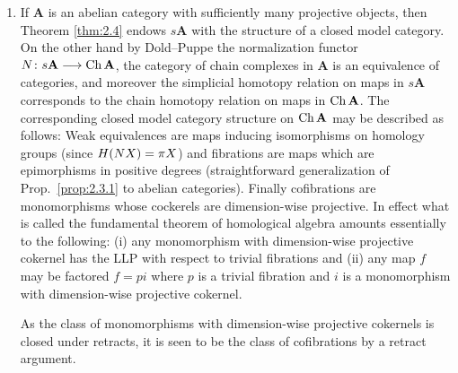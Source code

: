 \documentclass[../main]{subfiles}
\begin{document}
\begin{remarks*}
\begin{enumerate}
\begin{enumerate}[(i)]
        \item $f_q + g_q \colon X_q \vee FC_q \longrightarrow Z_q$ is an isomorphism for all $q$, where $FC_q$ is the free algebra generated by $C_q$ and $g_q\colon FC_q \longrightarrow Z_q$ is the unique algebra map which is the identity on $C_q$.
    \end{enumerate}
    Conversely, one may show \cite[Thm.\ 6.1]{kan_css_1957} that any free map $X \varrightarrow i Z$ may be factored \[X \longrightarrow Z^0 \longrightarrow Z^1 \longrightarrow \dots \longrightarrow Z\] where there are co-cartesian squares (\ref{eq:2.4.2}) with $P_n$ free and hence any free map is a cofibration. Furthermore given a cofibration $f$ we may factor it $f = pi$ where $i$ is free and $p$ is a trivial fibration: then $f$ is a retract of $i$ hence .
    
    \item If $\mathbf{A}$ is an abelian category with sufficiently many projective objects, then Theorem \ref{thm:2.4} endows $s\mathbf{A}$ with the structure of a closed model category. On the other hand by Dold--Puppe \cite{dold_homologie_1961} the normalization functor\\ $N \colon s\mathbf{A} \longrightarrow \operatorname{Ch} \mathbf{A}$, the category of chain complexes in $\mathbf{A}$ is an equivalence of categories, and moreover the simplicial homotopy relation on maps in $s\mathbf{A}$ corresponds to the chain homotopy relation on maps in $\operatorname{Ch}\mathbf{A}$. The corresponding closed model category structure on $\operatorname{Ch}\mathbf{A}$ may be described as follows: Weak equivalences are maps inducing isomorphisms on homology groups (since $H(NX) = \pi X$) and fibrations are maps which are epimorphisms in positive degrees (straightforward generalization of Prop.\ \ref{prop:2.3.1} to abelian categories). Finally cofibrations are monomorphisms whose cockerels are dimension-wise projective. In effect what is called the fundamental theorem of homological algebra amounts essentially to the following: (i) any monomorphism with dimension-wise projective cokernel has the LLP with respect to trivial fibrations and (ii) any map $f$ may be factored $f = pi$ where $p$ is a trivial fibration and $i$ is a monomorphism with dimension-wise projective cokernel.

    As the class of monomorphisms with dimension-wise projective cokernels is closed under retracts, it is seen to be the class of cofibrations by a retract argument.
\end{enumerate}
\end{remarks*}
\end{document}
